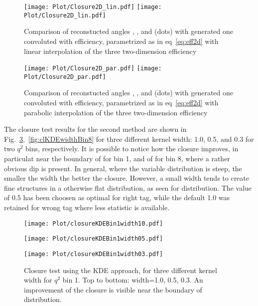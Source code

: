 \begin{figure}[hbt]
    \texttt{[image: Plot/Closure2D\_lin.pdf]}
    \texttt{[image: Plot/Closure2D\_lin.pdf]}
    \caption{Comparison of reconstucted angles \TK, \TL, and \PHI (dots) with generated one convoluted with efficiency, parametrized as in eq~\ref{eq:eff2d} with linear interpolation of the three two-dimension efficiency}
    \label{fig:clEff2Dlin}
\end{figure}

\begin{figure}[hbt]
    \texttt{[image: Plot/Closure2D\_par.pdf]}
    \texttt{[image: Plot/Closure2D\_par.pdf]}
    \caption{Comparison of reconstucted angles \TK, \TL, and \PHI (dots) with generated one convoluted with efficiency, parametrized as in eq~\ref{eq:eff2d} with parabolic interpolation of the three two-dimension efficiency}
    \label{fig:clEff2Dpar}
\end{figure}

The closure test results for the second method are shown in
Fig.~\ref{fig:clKDEwidthBin1},~\ref{fig:clKDEwidthBin8} for three
different kernel width: 1.0, 0.5, and 0.3 for two $q^2$ bins,
respectively. It is possible to notice how the closure improves, in
particulat near the boundary of \TK for bin 1, and of \PHI for bin 8,
where a rather obvious dip is present.  In general, where the variable
distribution is steep, the smaller the width the better the closure.
However, a small width tends to create fine structures in a otherwise
flat distribution, as seen for \PHI distribution.  The value of 0.5
has been choosen as optimal for right tag, while the default 1.0 was
retained for wrong tag where less statistic is available.

\begin{figure}[hbt]
    \texttt{[image: Plot/closureKDEBin1width10.pdf]}

    \texttt{[image: Plot/closureKDEBin1width05.pdf]}

    \texttt{[image: Plot/closureKDEBin1width03.pdf]}

    \caption{Closure test using the KDE approach, for three different kernel
        width for $q^2$ bin 1. Top to bottom: width=1.0, 0.5, 0.3.
        An improvement of the closure is visible near the boundary of \cTK distribution.}
    \label{fig:clKDEwidthBin1}
\end{figure}

